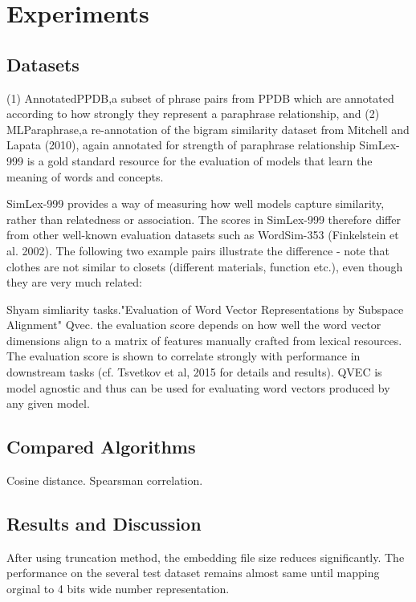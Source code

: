 \section{Experiments}
\label{sec:exp}

\subsection{Datasets}
(1) AnnotatedPPDB,a subset of phrase pairs from PPDB which are annotated according to how strongly they represent a paraphrase relationship, and (2) MLParaphrase,a re-annotation of the bigram similarity dataset from Mitchell and Lapata (2010), again annotated for strength of paraphrase relationship
SimLex-999 is a gold standard resource for the evaluation of models that learn the meaning of words and concepts.

SimLex-999 provides a way of measuring how well models capture similarity, rather than relatedness or association. The scores in SimLex-999 therefore differ from other well-known evaluation datasets such as WordSim-353 (Finkelstein et al. 2002). The following two example pairs illustrate the difference - note that clothes are not similar to closets (different materials, function etc.), even though they are very much related:

Shyam simliarity tasks."Evaluation of Word Vector Representations by Subspace Alignment" Qvec. the evaluation score depends on how well the word vector dimensions align to a matrix of features manually crafted from lexical resources. The evaluation score is shown to correlate strongly with performance in downstream tasks (cf. Tsvetkov et al, 2015 for details and results). QVEC is model agnostic and thus can be used for evaluating word vectors produced by any given model.

\subsection{Compared Algorithms}
Cosine distance. Spearsman correlation.

\subsection{Results and Discussion}
After using truncation method, the embedding file size reduces significantly. The performance on the several test dataset remains almost same until mapping orginal to 4 bits wide number representation.